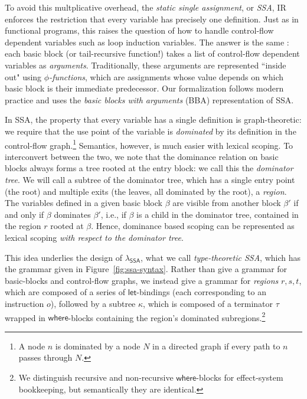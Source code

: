 \documentclass[acmsmall,screen,review]{acmart}
\newcommand{\ms}[1]{\ensuremath{\mathsf{#1}}}
\newcommand{\isotopessa}{\(\lambda_{\ms{SSA}}\)}
\begin{document}
To avoid this multplicative overhead, the \emph{static single assignment}, or \emph{SSA}, IR
enforces the restriction that every variable has precisely one definition. Just as in functional
programs, this raises the question of how to handle control-flow dependent variables such as loop
induction variables. The answer is the same \cite{appel-ssa}: each basic block (or tail-recursive
function!) takes a list of control-flow dependent variables as \emph{arguments}. Traditionally,
these arguments are represented ``inside out" using \emph{$\phi$-functions}, which are assignments
whose value depends on which basic block is their immediate predecessor. Our formalization follows
modern practice and uses the \emph{basic blocks with arguments} (BBA) representation of SSA.

In SSA, the property that every variable has a single definition is graph-theoretic: we require that
the use point of the variable is \emph{dominated} by its definition in the control-flow
graph.\footnote{ A node $n$ is dominated by a node $N$ in a directed graph if every path to $n$
passes through $N$. } Semantics, however, is much easier with lexical scoping. To interconvert
between the two, we note that the dominance relation on basic blocks always forms a tree rooted at
the entry block: we call this the \emph{dominator tree}. We will call a subtree of the dominator
tree, which has a single entry point (the root) and multiple exits (the leaves, all dominated by the
root), a \emph{region}. The variables defined in a given basic block $\beta$ are visible from
another block $\beta'$ if and only if $\beta$ dominates $\beta'$, i.e., if $\beta$ is a child in the
dominator tree, contained in the region $r$ rooted at $\beta$. Hence, dominance based scoping can be
represented as lexical scoping \emph{with respect to the dominator tree}.

This idea underlies the design of \isotopessa{}, what we call \emph{type-theoretic SSA}, which has
the grammar given in Figure~\ref{fig:ssa-syntax}. Rather than give a grammar for basic-blocks and
control-flow graphs, we instead give a grammar for \emph{regions} $r, s, t$, which are composed of a
series of \ms{let}-bindings (each corresponding to an instruction $o$), followed by a subtree
$\kappa$, which is composed of a terminator $\tau$ wrapped in \ms{where}-blocks containing the
region's dominated subregions.\footnote{We distinguish recursive and non-recursive \ms{where}-blocks
for effect-system bookkeeping, but semantically they are identical.}
\end{document}
